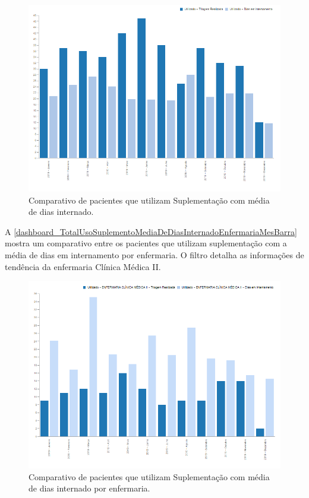 \begin{figure}[htb]
	\caption{\label{dashboard_TotalUsoSuplementoMediaDeDiasInternadoHospitalMesBarra}Comparativo de pacientes que utilizam Suplementação com média de dias internado.}
	\begin{center}
	    \includegraphics[scale=0.35]{Imagens/6.1.TotalUsoSuplementoMediaDeDiasInternadoHospitalMesBarra.png}
	\end{center}
\end{figure}

A \autoref{dashboard_TotalUsoSuplementoMediaDeDiasInternadoEnfermariaMesBarra} mostra um comparativo entre os pacientes que utilizam suplementação com a média de dias em internamento por enfermaria. O filtro detalha as informações de tendência da enfermaria Clínica Médica II.

\begin{figure}[htb]
	\caption{\label{dashboard_TotalUsoSuplementoMediaDeDiasInternadoEnfermariaMesBarra}Comparativo de pacientes que utilizam Suplementação com média de dias internado por
enfermaria.}
	\begin{center}
	    \includegraphics[scale=0.35]{Imagens/6.2.TotalUsoSuplementoMediaDeDiasInternadoEnfermariaMesBarra.png}
	\end{center}
\end{figure}

